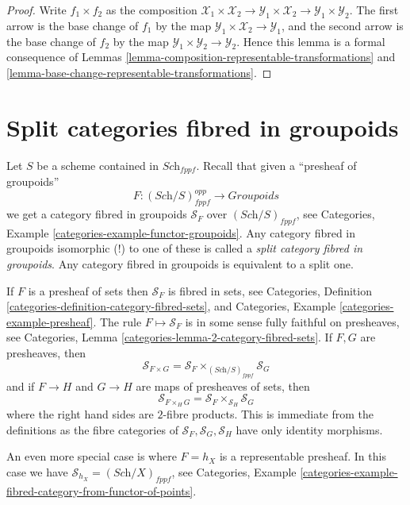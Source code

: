 \begin{proof}
Write $f_1 \times f_2$ as the composition
$\mathcal{X}_1 \times \mathcal{X}_2 \to
\mathcal{Y}_1 \times \mathcal{X}_2 \to
\mathcal{Y}_1 \times \mathcal{Y}_2$.
The first arrow is the base change of $f_1$ by the map
$\mathcal{Y}_1 \times \mathcal{X}_2 \to \mathcal{Y}_1$, and the second arrow
is the base change of $f_2$ by the map
$\mathcal{Y}_1 \times \mathcal{Y}_2 \to \mathcal{Y}_2$.
Hence this lemma is a formal
consequence of Lemmas \ref{lemma-composition-representable-transformations}
and \ref{lemma-base-change-representable-transformations}.
\end{proof}



\section{Split categories fibred in groupoids}
\label{section-split}

\noindent
Let $S$ be a scheme contained in $\textit{Sch}_{fppf}$.
Recall that given a ``presheaf of groupoids''
$$
F : (\textit{Sch}/S)_{fppf}^{opp} \longrightarrow \textit{Groupoids}
$$
we get a category fibred in groupoids $\mathcal{S}_F$ over
$(\textit{Sch}/S)_{fppf}$, see
Categories, Example \ref{categories-example-functor-groupoids}.
Any category fibred in groupoids isomorphic (!) to one of these
is called a {\it split category fibred in groupoids}.
Any category fibred in groupoids is equivalent to a split one.

\medskip\noindent
If $F$ is a presheaf of sets then $\mathcal{S}_F$ is
fibred in sets, see
Categories,
Definition \ref{categories-definition-category-fibred-sets},
and
Categories, Example \ref{categories-example-presheaf}.
The rule $F \mapsto \mathcal{S}_F$ is in some sense fully faithful
on presheaves, see
Categories, Lemma \ref{categories-lemma-2-category-fibred-sets}.
If $F, G$ are presheaves, then
$$
\mathcal{S}_{F \times G}
=
\mathcal{S}_F \times_{(\textit{Sch}/S)_{fppf}} \mathcal{S}_G
$$
and if $F \to H$ and $G \to H$ are maps of presheaves of sets, then
$$
\mathcal{S}_{F \times_H G} =
\mathcal{S}_F \times_{\mathcal{S}_H} \mathcal{S}_G
$$
where the right hand sides are $2$-fibre products. This is immediate
from the definitions as the fibre categories of
$\mathcal{S}_F, \mathcal{S}_G, \mathcal{S}_H$ have only identity morphisms.

\medskip\noindent
An even more special case is where $F = h_X$ is a representable
presheaf. In this case we have
$\mathcal{S}_{h_X} = (\textit{Sch}/X)_{fppf}$, see
Categories,
Example \ref{categories-example-fibred-category-from-functor-of-points}.

